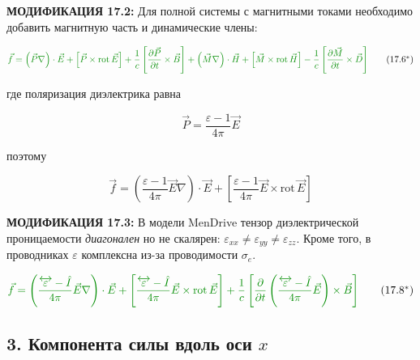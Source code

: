 \documentclass[a4paper,12pt]{article}
\newcommand{\modtext}[1]{\textcolor{modcolor}{#1}}
\newcommand{\modmath}[1]{\textcolor{modcolor}{#1}}
\newcommand{\modblock}[1]{\colorbox{modcolor!10}{\parbox{\dimexpr\linewidth-2\fboxsep}{#1}}}
\begin{document}
\modtext{
    \textbf{МОДИФИКАЦИЯ 17.2:} Для полной системы с магнитными токами необходимо
    добавить магнитную часть и динамические члены:
}

\modblock{
\modtext{
    \begin{equation}
    \modmath{
    \vec{f} = \left(\vec{P}\nabla\right)\cdot\vec{E} +
    \left[\vec{P} \times \text{rot}\,\vec{E}\right] +
    \frac{1}{c}\left[\frac{\partial\vec{P}}{\partial t} \times \vec{B}\right] +
    \left(\vec{M}\nabla\right)\cdot\vec{H} +
    \left[\vec{M} \times \text{rot}\,\vec{H}\right] -
    \frac{1}{c}\left[\frac{\partial\vec{M}}{\partial t} \times \vec{D}\right]
    }
    \tag{17.6$^*$}
    \end{equation}
}
}

\noindent
где поляризация диэлектрика равна

\begin{equation}
\vec{P} = \frac{\varepsilon - 1}{4\pi}\vec{E}
\tag{17.7}
\end{equation}

поэтому

\begin{equation}
\vec{f} = \left(\frac{\varepsilon - 1}{4\pi}\vec{E}\nabla\right)\cdot\vec{E} +
\left[\frac{\varepsilon - 1}{4\pi}\vec{E} \times \text{rot}\,\vec{E}\right]
\tag{17.8}
\end{equation}

\modtext{
    \textbf{МОДИФИКАЦИЯ 17.3:} В модели MenDrive тензор диэлектрической проницаемости
    \textit{диагонален} но не скалярен: $\varepsilon_{xx} \neq \varepsilon_{yy} \neq \varepsilon_{zz}$.
    Кроме того, в проводниках $\varepsilon$ комплексна из-за проводимости $\sigma_e$.
}

\modblock{
\modtext{
    \begin{equation}
    \modmath{
    \vec{f} = \left(\frac{\overleftrightarrow{\varepsilon} - \hat{I}}{4\pi}\vec{E}\nabla\right)\cdot\vec{E} +
    \left[\frac{\overleftrightarrow{\varepsilon} - \hat{I}}{4\pi}\vec{E} \times \text{rot}\,\vec{E}\right] +
    \frac{1}{c}\left[\frac{\partial}{\partial t}\left(\frac{\overleftrightarrow{\varepsilon} - \hat{I}}{4\pi}\vec{E}\right) \times \vec{B}\right]
    }
    \tag{17.8$^*$}
    \end{equation}
}
}

\subsection*{3. Компонента силы вдоль оси $x$}
\end{document}
